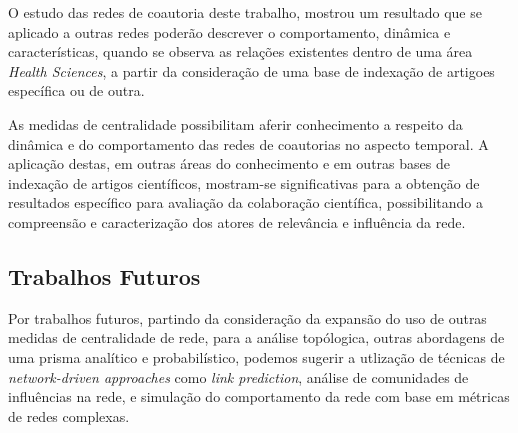 \documentclass[12pt]{article}
\begin{document}
O estudo das redes de coautoria deste trabalho, mostrou um resultado que se aplicado a outras redes poderão descrever o comportamento, dinâmica e características, quando se observa as relações existentes dentro de uma área \textit{Health Sciences}, a partir da consideração de uma base de indexação de artigoes específica ou de outra.

As medidas de centralidade possibilitam aferir conhecimento a respeito da dinâmica e do comportamento das redes de coautorias no aspecto temporal. A aplicação destas, em outras áreas do conhecimento e em outras bases de indexação de artigos científicos, mostram-se significativas para a obtenção de resultados específico para avaliação da colaboração científica, possibilitando a compreensão e caracterização dos atores de relevância e influência da rede.

\subsection{Trabalhos Futuros}

Por trabalhos futuros, partindo da consideração da expansão do uso de outras medidas de centralidade de rede, para a análise topólogica, outras abordagens de uma prisma analítico e probabilístico, podemos sugerir a utlização de técnicas de \textit{network-driven approaches} como \textit{link prediction}, análise de comunidades de influências na rede, e simulação do comportamento da rede com base em métricas de redes complexas.


\nocite{*}

\end{document}
